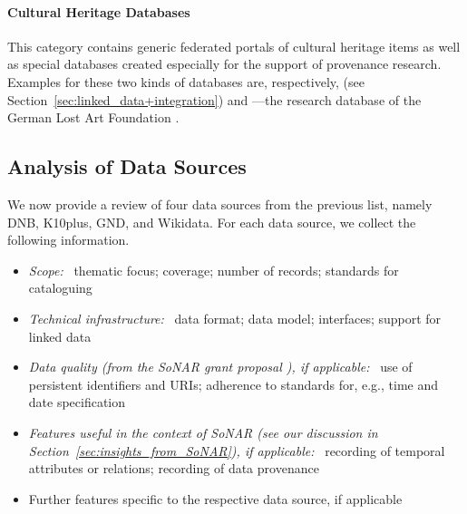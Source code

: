 \paragraph{Cultural Heritage Databases}

This category contains generic federated portals of cultural heritage items
as well as special databases created especially for the support of provenance research.
Examples for these two kinds of databases are, respectively,  \autocite{Europeana} (see Section~\ref{sec:linked_data+integration})
and ---the research database of the German Lost Art Foundation \autocite{Proveana}.

\subsection{Analysis of Data Sources}
\label{subsec:analysis_data_sources}


We now provide a review of four data sources from the previous list, namely
\gls{DNB}, \gls{K10plus}, \gls{GND}, and Wikidata.
%
%
%
For each data source, we collect the following information.
%
\begin{itemize}
  \item
    \emph{Scope:}~
    thematic focus; coverage; number of records; standards for cataloguing
  \item
    \emph{Technical infrastructure:}~
    data format; data model; interfaces; support for linked data
  \item
    \emph{Data quality (from the \gls{SoNAR} grant proposal \autocite[p.\,19ff.]{SchneiderKempf2018}),
    if applicable:}~
    use of persistent identifiers and \glspl{URI}; adherence to standards for, e.g., time and date specification
  \item
    \emph{Features useful in the context of \gls{SoNAR} (see our discussion in Section~\ref{sec:insights_from_SoNAR}), if applicable:}~
    recording of temporal attributes or relations; recording of data provenance
  \item
    Further features specific to the respective data source, if applicable
\end{itemize}

